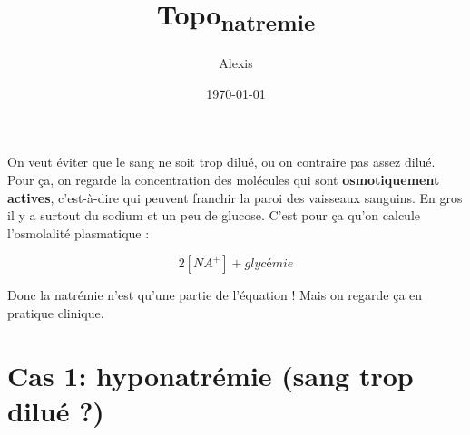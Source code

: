 \documentclass[11pt]{article}
\author{Alexis}
\date{\today}
\title{Topo\textsubscript{natremie}}
\begin{document}
\maketitle
\tableofcontents

On veut éviter que le sang ne soit trop dilué, ou on contraire pas assez dilué.
Pour ça, on regarde la concentration des molécules qui sont \textbf{osmotiquement actives}, c'est-à-dire qui peuvent franchir la paroi des vaisseaux sanguins.
En gros il y a surtout du sodium et un peu de glucose. C'est pour ça qu'on calcule l'osmolalité plasmatique :

$$ 2 [NA^+] + glycémie $$

Donc la natrémie n'est qu'une partie de l'équation ! Mais on regarde ça en pratique clinique.

\section{Cas 1: hyponatrémie (sang trop dilué ?)}
\label{sec:org34334d9}
\end{document}
